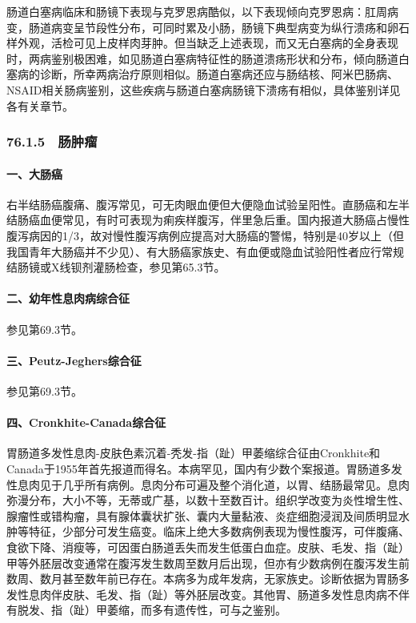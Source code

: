 肠道白塞病临床和肠镜下表现与克罗恩病酷似，以下表现倾向克罗恩病：肛周病变，肠道病变呈节段性分布，可同时累及小肠，肠镜下典型病变为纵行溃疡和卵石样外观，活检可见上皮样肉芽肿。但当缺乏上述表现，而又无白塞病的全身表现时，两病鉴别极困难，如见肠道白塞病特征性的肠道溃疡形状和分布，倾向肠道白塞病的诊断，所幸两病治疗原则相似。肠道白塞病还应与肠结核、阿米巴肠病、NSAID相关肠病鉴别，这些疾病与肠道白塞病肠镜下溃疡有相似，具体鉴别详见各有关章节。

\subsubsection{76.1.5　肠肿瘤}

\paragraph{一、大肠癌}

右半结肠癌腹痛、腹泻常见，可无肉眼血便但大便隐血试验呈阳性。直肠癌和左半结肠癌血便常见，有时可表现为痢疾样腹泻，伴里急后重。国内报道大肠癌占慢性腹泻病因的1/3，故对慢性腹泻病例应提高对大肠癌的警惕，特别是40岁以上（但我国青年大肠癌并不少见）、有大肠癌家族史、有血便或隐血试验阳性者应行常规结肠镜或X线钡剂灌肠检查，参见第65.3节。

\paragraph{二、幼年性息肉病综合征}

参见第69.3节。

\paragraph{三、Peutz-Jeghers综合征}

参见第69.3节。

\paragraph{四、Cronkhite-Canada综合征}

胃肠道多发性息肉-皮肤色素沉着-秃发-指（趾）甲萎缩综合征由Cronkhite和Canada于1955年首先报道而得名。本病罕见，国内有少数个案报道。胃肠道多发性息肉见于几乎所有病例。息肉分布可遍及整个消化道，以胃、结肠最常见。息肉弥漫分布，大小不等，无蒂或广基，以数十至数百计。组织学改变为炎性增生性、腺瘤性或错构瘤，具有腺体囊状扩张、囊内大量黏液、炎症细胞浸润及间质明显水肿等特征，少部分可发生癌变。临床上绝大多数病例表现为慢性腹泻，可伴腹痛、食欲下降、消瘦等，可因蛋白肠道丢失而发生低蛋白血症。皮肤、毛发、指（趾）甲等外胚层改变通常在腹泻发生数周至数月后出现，但亦有少数病例在腹泻发生前数周、数月甚至数年前已存在。本病多为成年发病，无家族史。诊断依据为胃肠多发性息肉伴皮肤、毛发、指（趾）等外胚层改变。其他胃、肠道多发性息肉病不伴有脱发、指（趾）甲萎缩，而多有遗传性，可与之鉴别。


